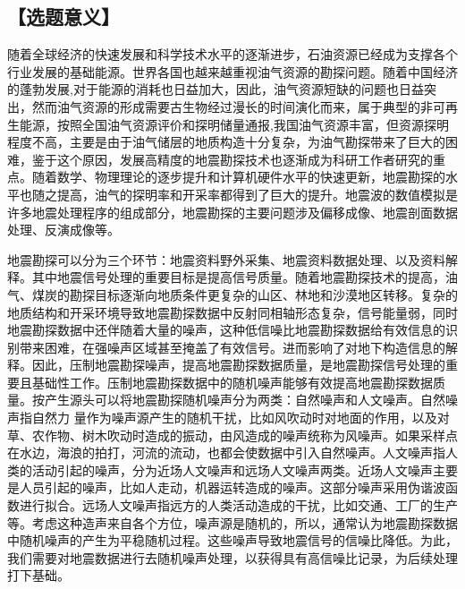 \documentclass[11pt]{article}
\newcommand{\kai}{\CJKfamily{kai}}
\begin{document}
\subsection*{\kai\fontsize{11pt}{10pt} \selectfont【选题意义】}
随着全球经济的快速发展和科学技术水平的逐渐进步，石油资源已经成为支撑各个行业发展的基础能源。世界各国也越来越重视油气资源的勘探问题。随着中国经济的蓬勃发展,对于能源的消耗也日益加大，因此，油气资源短缺的问题也日益突出，然而油气资源的形成需要古生物经过漫长的时间演化而来，属于典型的非可再生能源，按照全国油气资源评价和探明储量通报,我国油气资源丰富，但资源探明程度不高，主要是由于油气储层的地质构造十分复杂，为油气勘探带来了巨大的困难，鉴于这个原因，发展高精度的地震勘探技术也逐渐成为科研工作者研究的重点。随着数学、物理理论的逐步提升和计算机硬件水平的快速更新，地震勘探的水平也随之提高，油气的探明率和开采率都得到了巨大的提升。地震波的数值模拟是许多地震处理程序的组成部分，地震勘探的主要问题涉及偏移成像、地震剖面数据处理、反演成像等。
\par
地震勘探可以分为三个环节：地震资料野外采集、地震资料数据处理、以及资料解释。其中地震信号处理的重要目标是提高信号质量。随着地震勘探技术的提高，油气、煤炭的勘探目标逐渐向地质条件更复杂的山区、林地和沙漠地区转移。复杂的地质结构和开采环境导致地震勘探数据中反射同相轴形态复杂，信号能量弱，同时地震勘探数据中还伴随着大量的噪声，这种低信噪比地震勘探数据给有效信息的识别带来困难，在强噪声区域甚至掩盖了有效信号。进而影响了对地下构造信息的解释。因此，压制地震勘探噪声，提高地震勘探数据质量，是地震勘探信号处理的重要且基础性工作。压制地震勘探数据中的随机噪声能够有效提高地震勘探数据质量。按产生源头可以将地震勘探随机噪声分为两类：自然噪声和人文噪声。自然噪声指自然力
量作为噪声源产生的随机干扰，比如风吹动时对地面的作用，以及对草、农作物、树木吹动时造成的振动，由风造成的噪声统称为风噪声。如果采样点在水边，海浪的拍打，河流的流动，也都会使数据中引入自然噪声。人文噪声指人类的活动引起的噪声，分为近场人文噪声和远场人文噪声两类。近场人文噪声主要是人员引起的噪声，比如人走动，机器运转造成的噪声。这部分噪声采用伪谐波函数进行拟合。远场人文噪声指远方的人类活动造成的干扰，比如交通、工厂的生产等。考虑这种造声来自各个方位，噪声源是随机的，所以，通常认为地震勘探数据中随机噪声的产生为平稳随机过程。这些噪声导致地震信号的信噪比降低。为此，我们需要对地震数据进行去随机噪声处理，以获得具有高信噪比记录，为后续处理打下基础。
\par
\end{document}
